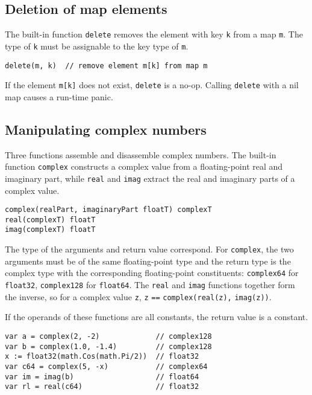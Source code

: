 \subsection*{Deletion of map elements}

The built-in function \texttt{delete} removes the element with key
\texttt{k} from a map \texttt{m}. The type of
\texttt{k} must be assignable to the key type
of \texttt{m}.

\begin{Verbatim}[frame=single]
delete(m, k)  // remove element m[k] from map m
\end{Verbatim}

If the element \texttt{m{[}k{]}} does not exist, \texttt{delete} is a
no-op. Calling \texttt{delete} with a nil map causes a
run-time panic.

\subsection*{Manipulating complex numbers}

Three functions assemble and disassemble complex numbers. The built-in
function \texttt{complex} constructs a complex value from a
floating-point real and imaginary part, while \texttt{real} and
\texttt{imag} extract the real and imaginary parts of a complex value.

\begin{Verbatim}[frame=single]
complex(realPart, imaginaryPart floatT) complexT
real(complexT) floatT
imag(complexT) floatT
\end{Verbatim}

The type of the arguments and return value correspond. For
\texttt{complex}, the two arguments must be of the same floating-point
type and the return type is the complex type with the corresponding
floating-point constituents: \texttt{complex64} for \texttt{float32},
\texttt{complex128} for \texttt{float64}. The \texttt{real} and
\texttt{imag} functions together form the inverse, so for a complex
value \texttt{z}, \texttt{z} \texttt{==} \texttt{complex(real(z),}
\texttt{imag(z))}.

If the operands of these functions are all constants, the return value
is a constant.

\begin{Verbatim}[frame=single]
var a = complex(2, -2)             // complex128
var b = complex(1.0, -1.4)         // complex128
x := float32(math.Cos(math.Pi/2))  // float32
var c64 = complex(5, -x)           // complex64
var im = imag(b)                   // float64
var rl = real(c64)                 // float32
\end{Verbatim}


